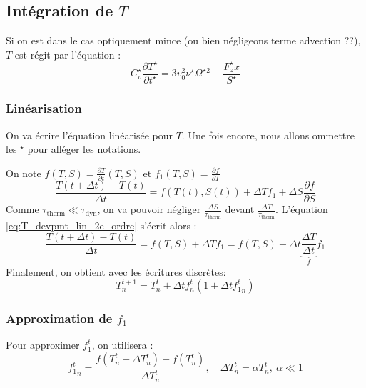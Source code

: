 \subsection{Intégration de $T$}
\label{subsec:integration_T}

Si on est dans le cas optiquement mince (ou bien négligeons terme advection ??), $T$ est régit par l'équation :
\begin{equation}
  C_v^\star \frac{\partial T^\star}{\partial t^\star} = 3v_0^2\nu^\star \Omega^\star{}^2 - \frac{F_z^\star x}{S^\star}
\end{equation}

\subsubsection{Linéarisation}
On va écrire l'équation linéarisée pour $T$. Une fois encore, nous allons ommettre les ${}^\star$ pour alléger les notations.

On note $f(T, S) = \frac{\partial T}{\partial t}(T, S)$ et $f_1(T, S) = \frac{\partial f}{\partial T}$
\begin{equation}
  \label{eq:T_devpmt_lin_2e_ordre} 
  \frac{T(t+\Delta t) - T(t)}{\Delta t} = f(T(t), S(t)) + \Delta Tf_1 + \Delta S\frac{\partial f}{\partial S}
\end{equation}
Comme $\tau_\textrm{therm} \ll \tau_\textrm{dyn}$, on va pouvoir négliger $\frac{\Delta S}{\tau_\textrm{therm}}$ devant $\frac{\Delta T}{\tau_\textrm{therm}}$. L'équation \eqref{eq:T_devpmt_lin_2e_ordre} s'écrit alors :
\begin{equation}
  \frac{T(t+\Delta t) - T(t)}{\Delta t} = f(T, S) + \Delta T f_1 = f(T, S) + \Delta t \underbrace{\frac{\Delta T}{\Delta t}}_{f} f_1
\end{equation}
Finalement, on obtient avec les écritures discrètes:
\begin{equation}
  T^{t+1}_n = T^{t}_n + \Delta t f^t_n \left(1 + \Delta t {f_1^t}_n\right)
\end{equation}

\subsubsection{Approximation de $f_1$}
Pour approximer $f_1^t$, on utilisera :
\begin{equation}
  {f_1^t}_n = \frac{f(T_n^t+\Delta T_n^t) - f(T_n^t)}{\Delta T_n^t}, \quad \Delta T_n^t = \alpha T_n^t,\ \alpha \ll 1
\end{equation}
